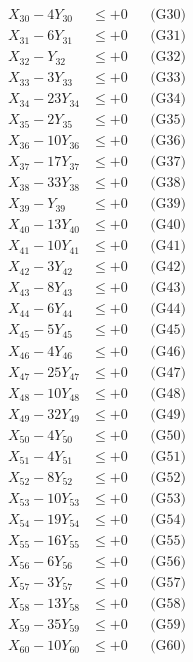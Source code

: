 \documentclass[a4paper,10pt]{article}
\begin{document}
{\begin{align}
X_{30} - 4Y_{30} &\leq +0 && \text{(G30)} \\
X_{31} - 6Y_{31} &\leq +0 && \text{(G31)} \\
X_{32} - Y_{32} &\leq +0 && \text{(G32)} \\
X_{33} - 3Y_{33} &\leq +0 && \text{(G33)} \\
\allowbreak
X_{34} - 23Y_{34} &\leq +0 && \text{(G34)} \\
X_{35} - 2Y_{35} &\leq +0 && \text{(G35)} \\
X_{36} - 10Y_{36} &\leq +0 && \text{(G36)} \\
X_{37} - 17Y_{37} &\leq +0 && \text{(G37)} \\
X_{38} - 33Y_{38} &\leq +0 && \text{(G38)} \\
X_{39} - Y_{39} &\leq +0 && \text{(G39)} \\
X_{40} - 13Y_{40} &\leq +0 && \text{(G40)} \\
X_{41} - 10Y_{41} &\leq +0 && \text{(G41)} \\
X_{42} - 3Y_{42} &\leq +0 && \text{(G42)} \\
X_{43} - 8Y_{43} &\leq +0 && \text{(G43)} \\
\allowbreak
X_{44} - 6Y_{44} &\leq +0 && \text{(G44)} \\
X_{45} - 5Y_{45} &\leq +0 && \text{(G45)} \\
X_{46} - 4Y_{46} &\leq +0 && \text{(G46)} \\
X_{47} - 25Y_{47} &\leq +0 && \text{(G47)} \\
X_{48} - 10Y_{48} &\leq +0 && \text{(G48)} \\
X_{49} - 32Y_{49} &\leq +0 && \text{(G49)} \\
X_{50} - 4Y_{50} &\leq +0 && \text{(G50)} \\
X_{51} - 4Y_{51} &\leq +0 && \text{(G51)} \\
X_{52} - 8Y_{52} &\leq +0 && \text{(G52)} \\
X_{53} - 10Y_{53} &\leq +0 && \text{(G53)} \\
\allowbreak
X_{54} - 19Y_{54} &\leq +0 && \text{(G54)} \\
X_{55} - 16Y_{55} &\leq +0 && \text{(G55)} \\
X_{56} - 6Y_{56} &\leq +0 && \text{(G56)} \\
X_{57} - 3Y_{57} &\leq +0 && \text{(G57)} \\
X_{58} - 13Y_{58} &\leq +0 && \text{(G58)} \\
X_{59} - 35Y_{59} &\leq +0 && \text{(G59)} \\
X_{60} - 10Y_{60} &\leq +0 && \text{(G60)} \\

\end{align}}
\end{document}
